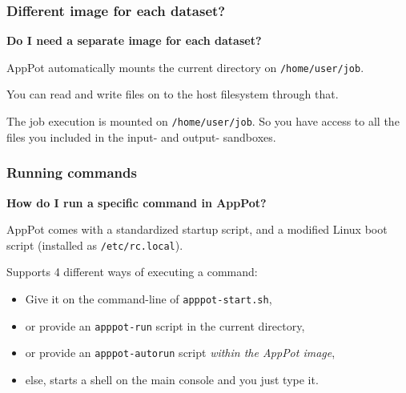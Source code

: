 \documentclass{beamer}
\begin{document}
  



\begin{frame}
  \frametitle{Different image for each dataset?}
  \label{sec:14}
  \textbf{Do I need a separate image for each dataset?}
  
  \+
  AppPot automatically mounts the current directory on \texttt{/home/user/job}.  

  \+
  You can read and write files on to the host filesystem through that.

  \+
  The job execution is mounted on \texttt{/home/user/job}.
  So you have access to all the files you included in the input- and
  output- sandboxes.
\end{frame}


\begin{frame}
  \frametitle{Running commands}
  \label{sec:13}
  \textbf{How do I run a specific command in AppPot?}

  \+
  AppPot comes with a standardized startup script, and a modified
  Linux boot script (installed as \texttt{/etc/rc.local}).

  \+
  Supports 4 different ways of executing a command:
  \begin{itemize}
  \item Give it on the command-line of \texttt{apppot-start.sh},
  \item or provide an \texttt{apppot-run} script in the current directory,
  \item or provide an \texttt{apppot-autorun} script \emph{within the AppPot image},
  \item else, starts a shell on the main console and you just type it.
  \end{itemize}
\end{frame}
\end{document}
